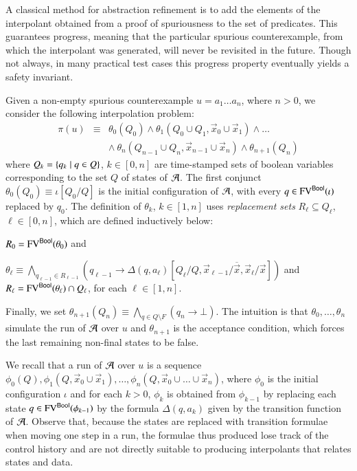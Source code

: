 \documentclass[10pt,conference,letterpaper,twocolumn]{IEEEtran}
\begin{document}
A classical method for abstraction refinement is to add the elements
of the interpolant obtained from a proof of spuriousness to the set of
predicates. This guarantees progress, meaning that the particular
spurious counterexample, from which the interpolant was generated,
will never be revisited in the future. Though not always, in many
practical test cases this progress property eventually yields a safety
invariant.

Given a non-empty spurious counterexample $u = a_1\ldots a_n$, where
$n>0$, we consider the following interpolation problem: 
\begin{eqnarray}\label{eq:interpolation-problem}
\pi(u) & \equiv & \theta_0(Q_0) \wedge \theta_1(Q_0 \cup Q_1,\vec{x}_0
\cup \vec{x}_1) \wedge \ldots \\ 
&& \wedge~ \theta_n(Q_{n-1} \cup Q_n,\vec{x}_{n-1} \cup \vec{x}_n) \wedge \theta_{n+1}(Q_n) \nonumber
\end{eqnarray}
where $Q_k = \left\{ q_k \mid q \in Q \right\}$, $k \in [0,n]$ are time-stamped
sets of boolean variables corresponding to the set $Q$ of states of
$\mathcal{A}$. The first conjunct $\theta_0(Q_0) \equiv \iota[Q_0/Q]$ is the
initial configuration of $\mathcal{A}$, with every $q \in \mathrm{FV}^{\mathsf{Bool}}(\iota)$
replaced by $q_0$. The definition of $\theta_k$, $k\in[1,n]$ uses
\emph{replacement sets} $R_\ell \subseteq Q_\ell$, $\ell\in [0,n]$,
which are defined inductively below: \begin{compactitem}
\item $R_0 = \mathrm{FV}^{\mathsf{Bool}}(\theta_0)$ and 
%
\item $\theta_\ell \equiv \bigwedge_{q_{\ell-1}\in R_{\ell-1}}
  (q_{\ell-1} \rightarrow
  \Delta(q,a_\ell)[Q_\ell/Q,\vec{x}_{\ell-1}/\overline{\vec{x}},\vec{x}_\ell/\vec{x}])$
  and $R_\ell = \mathrm{FV}^{\mathsf{Bool}}(\theta_\ell) \cap Q_\ell$, for each
  $\ell\in[1,n]$.
\end{compactitem}
Finally, we set $\theta_{n+1}(Q_n) \equiv \bigwedge_{q \in Q \setminus
  F} (q_n \rightarrow \bot)$. The intuition is that $\theta_0, \ldots,
\theta_n$ simulate the run of $\mathcal{A}$ over $u$ and $\theta_{n+1}$ is the
acceptance condition, which forces the last remaining non-final states
to be false. 

We recall that a run of $\mathcal{A}$ over $u$ is a sequence $\phi_0(Q),
\phi_1(Q,\vec{x}_0\cup\vec{x}_1), \ldots,
\phi_n(Q,\vec{x}_0\cup\ldots\cup\vec{x}_n)$, where $\phi_0$ is the
initial configuration $\iota$ and for each $k>0$, $\phi_k$ is obtained
from $\phi_{k-1}$ by replacing each state $q \in
\mathrm{FV}^{\mathsf{Bool}}(\phi_{k-1})$ by the formula $\Delta(q,a_k)$ given by the
transition function of $\mathcal{A}$. Observe that, because the states are
replaced with transition formulae when moving one step in a run, the
formulae thus produced lose track of the control history and are not
directly suitable to producing interpolants that relates states and
data.
\end{document}

